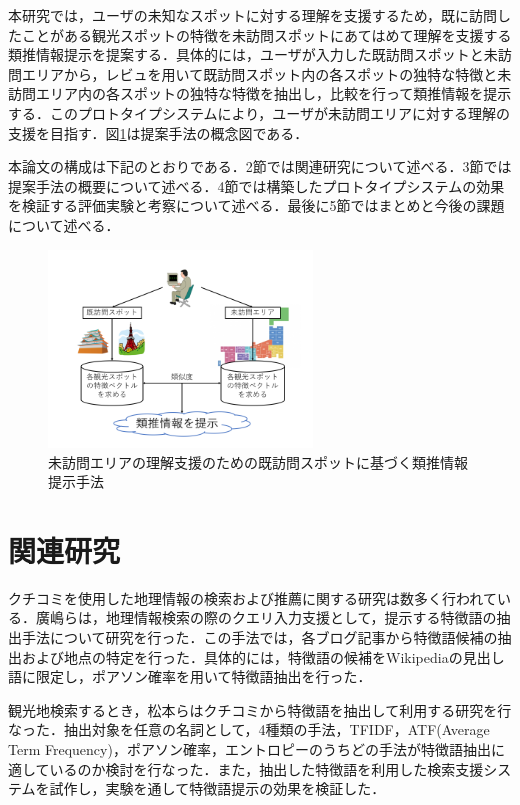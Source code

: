 \documentclass{deimj}
\begin{document}
本研究では，ユーザの未知なスポットに対する理解を支援するため，既に訪問したことがある観光スポットの特徴を未訪問スポットにあてはめて理解を支援する類推情報提示を提案する．具体的には，ユーザが入力した既訪問スポットと未訪問エリアから，レビュを用いて既訪問スポット内の各スポットの独特な特徴と未訪問エリア内の各スポットの独特な特徴を抽出し，比較を行って類推情報を提示する．このプロトタイプシステムにより，ユーザが未訪問エリアに対する理解の支援を目指す．図\ref{fig:photo_image}は提案手法の概念図である．

本論文の構成は下記のとおりである．2節では関連研究について述べる．3節では提案手法の概要について述べる．4節では構築したプロトタイプシステムの効果を検証する評価実験と考察について述べる．最後に5節ではまとめと今後の課題について述べる．

\begin{figure}[t]
  \begin{center}
    \includegraphics[clip,width=7.0cm]{picture/Photo_Image.png}
    \caption{未訪問エリアの理解支援のための既訪問スポットに基づく類推情報提示手法}
    \label{fig:photo_image}
   \end{center}
\end{figure}


\section{関連研究}
\label{sec:Related Work}
クチコミを使用した地理情報の検索および推薦に関する研究は数多く行われている．廣嶋ら\cite{Codd01}は，地理情報検索の際のクエリ入力支援として，提示する特徴語の抽出手法について研究を行った．この手法では，各ブログ記事から特徴語候補の抽出および地点の特定を行った．具体的には，特徴語の候補をWikipediaの見出し語に限定し，ポアソン確率を用いて特徴語抽出を行った．

観光地検索するとき，松本ら\cite{Codd02}はクチコミから特徴語を抽出して利用する研究を行なった．抽出対象を任意の名詞として，4種類の手法，TFIDF，ATF(Average Term Frequency)，ポアソン確率，エントロピーのうちどの手法が特徴語抽出に適しているのか検討を行なった．また，抽出した特徴語を利用した検索支援システムを試作し，実験を通して特徴語提示の効果を検証した．
\end{document}
